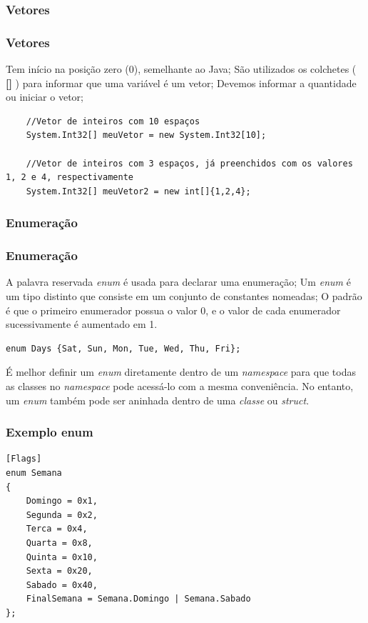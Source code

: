 \documentclass{beamer}
\begin{document}
\subsubsection{Vetores}
\begin{frame}[fragile]
\frametitle{Vetores}
\begin{outline}
	\1 Tem início na posição zero (0), semelhante ao Java;
	\1 São utilizados os colchetes (\textbf{ [\space\space\space] }) para informar que uma variável é um vetor;
	\1 Devemos informar a quantidade ou iniciar o vetor;
\end{outline}
\begin{lstlisting}
	//Vetor de inteiros com 10 espaços
	System.Int32[] meuVetor = new System.Int32[10];
	
	//Vetor de inteiros com 3 espaços, já preenchidos com os valores 1, 2 e 4, respectivamente
	System.Int32[] meuVetor2 = new int[]{1,2,4};
\end{lstlisting}
\end{frame}


\subsubsection{Enumeração}

\begin{frame}[fragile]
\frametitle{Enumeração}
\begin{outline}
	\1 	A palavra reservada \textit{enum} é usada para declarar uma enumeração;
	\1 Um \textit{enum} é um tipo distinto que consiste em um conjunto de constantes nomeadas;
	\1 O padrão é que o primeiro enumerador possua o valor 0, e o valor de cada enumerador sucessivamente é aumentado em 1.
	\1 [Ex~~]
	\begin{lstlisting}
enum Days {Sat, Sun, Mon, Tue, Wed, Thu, Fri};
	\end{lstlisting}
	\1 [Dica] É melhor definir um \textit{enum} diretamente dentro de um \textit{namespace} para que todas as classes no \textit{namespace} pode acessá-lo com a mesma conveniência. No entanto, um \textit{enum} também pode ser aninhada dentro de uma \textit{classe} ou \textit{struct}.
\end{outline}
\end{frame}


\begin{frame}[fragile]
\frametitle{Exemplo enum}
\begin{lstlisting}
[Flags]
enum Semana
{
	Domingo = 0x1,
	Segunda = 0x2,
	Terca = 0x4,
	Quarta = 0x8,
	Quinta = 0x10,
	Sexta = 0x20,
	Sabado = 0x40,
	FinalSemana = Semana.Domingo | Semana.Sabado
};
\end{lstlisting}
\end{frame}
\end{document}
